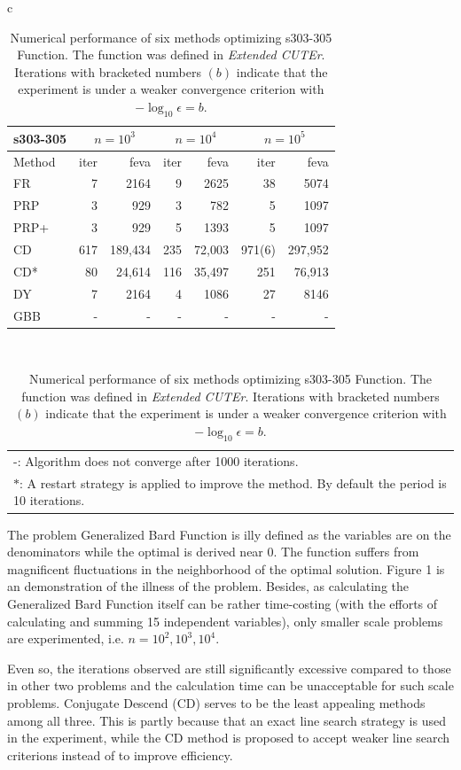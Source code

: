 \documentclass[11pt,a4paper]{article}
\begin{document}
\begin{table}
\label{tab2}
\centering
\begin{tabular}{c}
\begin{tabular}{l|rr|rr|rr}
\hline
\multicolumn{1}{c|}{\textbf{s303-305}} & \multicolumn{2}{c|}{$n=10^3$} & \multicolumn{2}{c|}{$n=10^4$} & \multicolumn{2}{c}{$n=10^5$} \\
\hline
Method & iter & feva & iter & feva & iter & feva \\
\hline
FR    &  7 & 2164 & 9 & 2625 & 38 & 5074 \\
PRP   &  3 & 929 & 3 & 782 & 5 & 1097 \\
PRP+  &  3 & 929 & 5 & 1393 & 5 & 1097 \\
CD    &  617 & 189,434 & 235 & 72,003 & 971(6) & 297,952 \\
CD*   &  80 & 24,614 & 116 & 35,497 & 251 & 76,913 \\
DY    &  7 & 2164 & 4 & 1086 & 27 & 8146 \\
GBB   & - & - & - & - & - & - \\
\hline
\end{tabular} \\
\begin{tabular}{l}
  -: Algorithm does not converge after 1000 iterations. \\
  $*$: A restart strategy is applied to improve the method. By default the period is 10 iterations. \\
\end{tabular}
\end{tabular}
\caption{Numerical performance of six methods optimizing s303-305 Function. The function was defined in \textit{Extended CUTEr}. Iterations with bracketed numbers $(b)$ indicate that the experiment is under a weaker convergence criterion with $-\log_{10}\epsilon=b$.}
\end{table}

The problem Generalized Bard Function is illy defined as the variables are on the denominators while the optimal is derived near $0$. The function suffers from magnificent fluctuations in the neighborhood of the optimal solution. Figure 1 is an demonstration of the illness of the problem. Besides, as calculating the Generalized Bard Function itself can be rather time-costing (with the efforts of calculating and summing 15 independent variables), only smaller scale problems are experimented, i.e. $n=10^2,10^3,10^4$.

Even so, the iterations observed are still significantly excessive compared to those in other two problems and the calculation time can be unacceptable for such scale problems. Conjugate Descend (CD) serves to be the least appealing methods among all three. This is partly because that an exact line search strategy is used in the experiment, while the CD method is proposed to accept weaker line search criterions instead of to improve efficiency.
\end{document}

